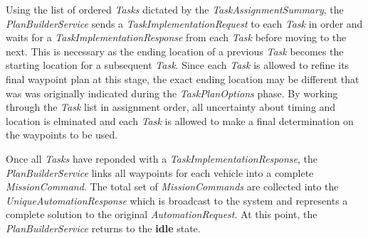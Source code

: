 Using the list of ordered \emph{Tasks} dictated by the
\emph{TaskAssignmentSummary}, the \emph{PlanBuilderService} sends a
\emph{TaskImplementationRequest} to each \emph{Task} in order and waits
for a \emph{TaskImplementationResponse} from each \emph{Task} before
moving to the next. This is necessary as the ending location of a
previous \emph{Task} becomes the starting location for a subsequent
\emph{Task}. Since each \emph{Task} is allowed to refine its final
waypoint plan at this stage, the exact ending location may be different
that was was originally indicated during the \emph{TaskPlanOptions}
phase. By working through the \emph{Task} list in assignment order, all
uncertainty about timing and location is elminated and each \emph{Task}
is allowed to make a final determination on the waypoints to be used.

Once all \emph{Tasks} have reponded with a
\emph{TaskImplementationResponse}, the \emph{PlanBuilderService} links
all waypoints for each vehicle into a complete \emph{MissionCommand}.
The total set of \emph{MissionCommands} are collected into the
\emph{UniqueAutomationResponse} which is broadcast to the system and
represents a complete solution to the original \emph{AutomationRequest}.
At this point, the \emph{PlanBuilderService} returns to the
\textbf{idle} state.

